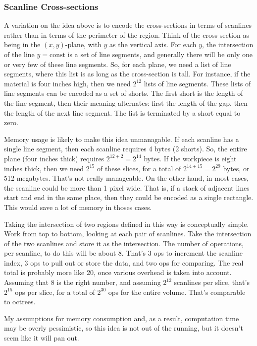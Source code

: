 \documentclass[titlepage,oneside,10pt]{article}
\begin{document}
\subsubsection{Scanline Cross-sections}

A variation on the idea above is to encode the cross-sections in terms
of scanlines rather than in terms of the perimeter of the
region. Think of the cross-section as being in the $(x,y)$-plane, with
$y$ as the vertical axis. For each $y$, the intersection of the line
$y=\mbox{const}$ is a set of line segments, and generally there will
be only one or very few of these line segments. So, for each plane, we
need a list of line segments, where this list is as long as the
cross-section is tall. For instance, if the material is four inches
high, then we need $2^{12}$ lists of line segments. These lists of
line segments can be encoded as a set of shorts. The first short is
the length of the line segment, then their meaning alternates: first
the length of the gap, then the length of the next line segment. The
list is terminated by a short equal to zero.

Memory usage is likely to make this idea unmanagable. If each scanline
has a single line segment, then each scanline requires 4 bytes (2
shorts). So, the entire plane (four inches thick) requires
$2^{12+2}=2^{14}$ bytes. If the workpiece is eight inches thick, then
we need $2^{15}$ of these slices, for a total of $2^{14+15}=2^{29}$
bytes, or 512 megabytes. That's not really manageable. On the other
hand, in most cases, the scanline could be more than 1 pixel
wide. That is, if a stack of adjacent lines start and end in the same
place, then they could be encoded as a single rectangle. This would
save a lot of memory in thoses cases.

Taking the intersection of two regions defined in this way is
conceptually simple. Work from top to bottom, looking at each pair of
scanlines. Take the intersection of the two scanlines and store it as
the intersection. The number of operations, per scanline, to do this
will be about 8. That's 3 ops to increment the scanline index, 3 ops
to pull out or store the data, and two ops for comparing. The real
total is probably more like 20, once various overhead is taken into
account. Assuming that 8 is the right number, and assuming $2^{12}$
scanlines per slice, that's $2^{15}$ ops per slice, for a total of
$2^{30}$ ops for the entire volume. That's comparable to octrees. 

My assumptions for memory consumption and, as a result, computation
time may be overly pessimistic, so this idea is not out of the
running, but it doesn't seem like it will pan out.
\end{document}
